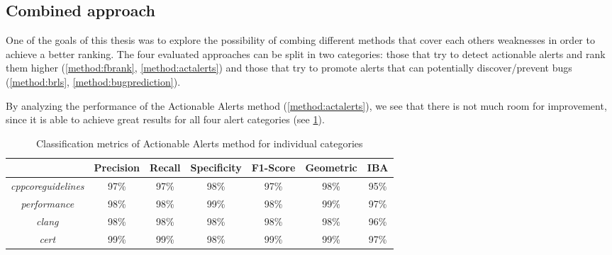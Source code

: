 \subsection{Combined approach}
\label{results:ensemble_approach}
One of the goals of this thesis was to explore the possibility of combing different methods that cover each others weaknesses in order to achieve a better ranking. The four evaluated approaches can be split in two categories: those that try to detect actionable alerts and rank them higher (\cref{method:fbrank}, \cref{method:actalerts}) and those that try to promote alerts that can potentially discover/prevent bugs (\cref{method:brls}, \cref{method:bugprediction}).

By analyzing the performance of the Actionable Alerts method (\cref{method:actalerts}), we see that there is not much room for improvement, since it is able to achieve great results for all four alert categories (see \cref{results:individual_categories}).

\begin{table}[H]
	\centering
	\caption{Classification metrics of Actionable Alerts method for individual categories}
	\label{results:individual_categories}
	\begin{tabular}{@{}ccccccc@{}}
		\toprule
		& \textbf{Precision} & \textbf{Recall} & \textbf{Specificity} & \textbf{F1-Score} & \textbf{Geometric} & \textbf{IBA} \\ \midrule
		\textit{cppcoreguidelines} & 97\%               & 97\%            & 98\%                 & 97\%              & 98\%               & 95\%         \\
		\textit{performance}       & 98\%               & 98\%            & 99\%                 & 98\%              & 99\%               & 97\%         \\
		\textit{clang}             & 98\%               & 98\%            & 98\%                 & 98\%              & 98\%               & 96\%         \\
		\textit{cert}              & 99\%               & 99\%            & 98\%                 & 99\%              & 99\%               & 97\%         \\ \bottomrule
	\end{tabular}
\end{table}


